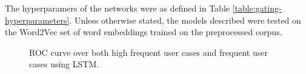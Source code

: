 The hyperparamers of the networks were as defined in Table \ref{table:gating-hyperparameters}. Unless otherwise stated, the models described were tested on the Word2Vec set of word embeddings trained on the preprocessed corpus. 
 
    \begin{figure}[thpb]


      \centering
      \caption{ROC curve over both high frequent user cases and frequent user cases using LSTM.}
      \label{graph:roc-LSTM-noise_vs_features}
   \end{figure}



